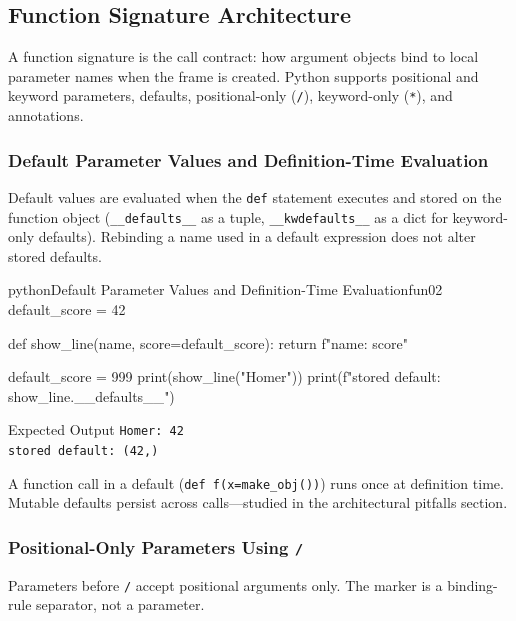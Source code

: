 \subsection{Function Signature Architecture}

A function signature is the call contract: how argument objects bind to local parameter names when the frame is created. Python supports positional and keyword parameters, defaults, positional-only (\texttt{/}), keyword-only (\texttt{*}), and annotations.

\subsubsection{Default Parameter Values and Definition-Time Evaluation}

Default values are evaluated when the \texttt{def} statement executes and stored on the function object (\texttt{\_\_defaults\_\_} as a tuple, \texttt{\_\_kwdefaults\_\_} as a dict for keyword-only defaults). Rebinding a name used in a default expression does not alter stored defaults.

\begin{codebox}[]{python}{Default Parameter Values and Definition-Time Evaluation}{fun02}
default_score = 42

def show_line(name, score=default_score):
    return f"{name}: {score}"

default_score = 999
print(show_line("Homer"))
print(f"stored default: {show_line.__defaults__}")
\end{codebox}


\begin{iobox}{Expected Output}
\texttt{Homer: 42} \\
\texttt{stored default: (42,)} \\
\end{iobox}




A function call in a default (\texttt{def f(x=make\_obj())}) runs once at definition time. Mutable defaults persist across calls---studied in the architectural pitfalls section.

\subsubsection{Positional-Only Parameters Using \texttt{/}}

Parameters before \texttt{/} accept positional arguments only. The marker is a binding-rule separator, not a parameter.

